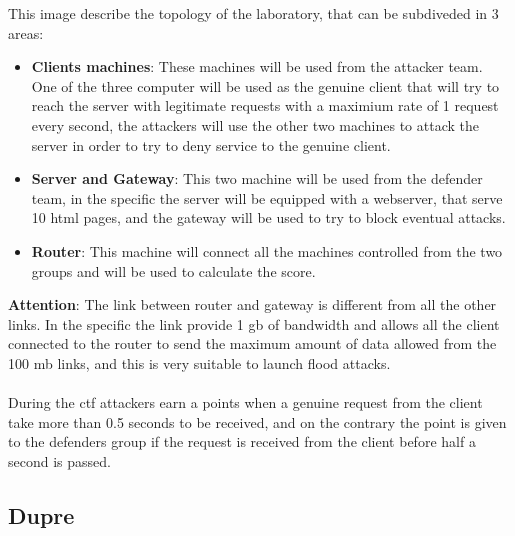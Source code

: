 \documentclass[14pt]{article}
\begin{document}
This image describe the topology of the laboratory, that can be subdiveded in 3 areas:
\begin{itemize}
	\item \textbf{Clients machines}: These machines will be used from the attacker team. One of the three computer will be used as the genuine client that will try to reach the server with legitimate requests with a maximium rate of 1 request every second, the attackers will use the other two machines to attack the server in order to try to deny service to the genuine client.
	
	\item \textbf{Server and Gateway}: This two machine will be used from the defender team, in the specific the server will be equipped with a webserver, that serve 10 html pages, and the gateway will be used to try to block eventual attacks.
	
	\item \textbf{Router}: This machine will connect all the machines controlled from the two groups and will be used to calculate the score.
\end{itemize}

\textbf{Attention}: The link between router and gateway is different from all the other links. In the specific the link provide 1 gb of bandwidth and allows all the client connected to the router to send the maximum amount of data allowed from the 100 mb links, and this is very suitable to launch flood attacks.
\\
\\
During the ctf attackers earn a points when a genuine request from the client take more than 0.5 seconds to be received, and on the contrary the point is given to the defenders group if the request is received from the client before half a second is passed. 

\subsection{Dupre}
\end{document}
